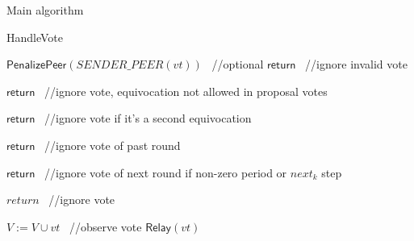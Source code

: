 \documentclass[10pt,a4paper]{article}
\begin{document}
\begin{section}{Main algorithm}
\begin{subsection}{HandleVote}
\begin{algorithm}[H]
\begin{algorithmic}[1]
            
            


                \State $\mathsf{PenalizePeer}(SENDER\_PEER(vt))$ \ //optional
                \State $\mathsf{return}$ \ //ignore invalid vote
            \EndIf

                \State $\mathsf{return}$ \ //ignore vote, equivocation not allowed in proposal votes
            \EndIf

                \State $\mathsf{return}$ \ //ignore vote if it's a second equivocation
            \EndIf

                \State $\mathsf{return}$ \ //ignore vote of past round
            \EndIf

                \State $\mathsf{return}$ \ //ignore vote of next round if non-zero period or $next_k$ step
            \EndIf

                \State $return$ \ //ignore vote
            \EndIf

            \State $V := V \cup vt$ \ //observe vote
            \State $\mathsf{Relay}(vt)$


\end{algorithmic}
\end{algorithm}
\end{subsection}
\end{section}
\end{document}
